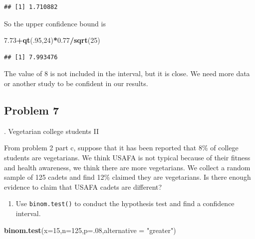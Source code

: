 \documentclass[
]{book}
\newenvironment{Shaded}{\begin{snugshade}}{\end{snugshade}}
\newcommand{\DataTypeTok}[1]{\textcolor[rgb]{0.13,0.29,0.53}{#1}}
\newcommand{\DecValTok}[1]{\textcolor[rgb]{0.00,0.00,0.81}{#1}}
\newcommand{\FloatTok}[1]{\textcolor[rgb]{0.00,0.00,0.81}{#1}}
\newcommand{\KeywordTok}[1]{\textcolor[rgb]{0.13,0.29,0.53}{\textbf{#1}}}
\newcommand{\NormalTok}[1]{#1}
\newcommand{\OperatorTok}[1]{\textcolor[rgb]{0.81,0.36,0.00}{\textbf{#1}}}
\newcommand{\StringTok}[1]{\textcolor[rgb]{0.31,0.60,0.02}{#1}}
\providecommand{\tightlist}{%
  \setlength{\itemsep}{0pt}\setlength{\parskip}{0pt}}
\begin{document}
\begin{verbatim}
## [1] 1.710882
\end{verbatim}

So the upper confidence bound is

\begin{Shaded}
\begin{Highlighting}[]
\FloatTok{7.73}\OperatorTok{+}\KeywordTok{qt}\NormalTok{(.}\DecValTok{95}\NormalTok{,}\DecValTok{24}\NormalTok{)}\OperatorTok{*}\FloatTok{0.77}\OperatorTok{/}\KeywordTok{sqrt}\NormalTok{(}\DecValTok{25}\NormalTok{)}
\end{Highlighting}
\end{Shaded}

\begin{verbatim}
## [1] 7.993476
\end{verbatim}

The value of 8 is not included in the interval, but it is close. We need more data or another study to be confident in our results.

\hypertarget{problem-7-2}{%
\subsection{Problem 7}\label{problem-7-2}}

. Vegetarian college students II

From problem 2 part c, suppose that it has been reported that 8\% of college students are vegetarians. We think USAFA is not typical because of their fitness and health awareness, we think there are more vegetarians. We collect a random sample of 125 cadets and find 12\% claimed they are vegetarians. Is there enough evidence to claim that USAFA cadets are different?

\begin{enumerate}
\def\labelenumi{\alph{enumi}.}
\tightlist
\item
  Use \texttt{binom.test()} to conduct the hypothesis test and find a confidence interval.
\end{enumerate}

\begin{Shaded}
\begin{Highlighting}[]
\KeywordTok{binom.test}\NormalTok{(}\DataTypeTok{x=}\DecValTok{15}\NormalTok{,}\DataTypeTok{n=}\DecValTok{125}\NormalTok{,}\DataTypeTok{p=}\NormalTok{.}\DecValTok{08}\NormalTok{,}\DataTypeTok{alternative =} \StringTok{"greater"}\NormalTok{)}
\end{Highlighting}
\end{Shaded}
\end{document}
